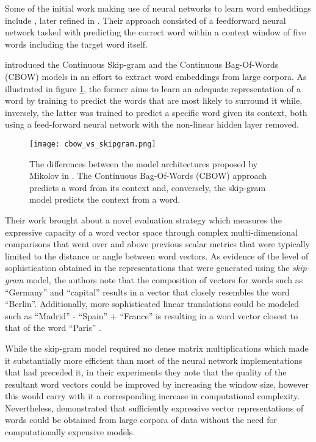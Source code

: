 \documentclass[../../fyp.tex]{subfiles}
\begin{document}
Some of the initial work making use of neural networks to learn word embeddings include \cite{collobert2008}, later refined in \cite{collobert2011}. Their approach consisted of a feedforward neural network tasked with predicting the correct word within a context window of five words including the target word itself.

\cite{mikolov2013} introduced the Continuous Skip-gram and the Continuous Bag-Of-Words (CBOW) models in an effort to extract word embeddings from large corpora. As illustrated in figure \ref{fig:cbow_vs_skipgram}, the former aims to learn an adequate representation of a word by training to predict the words that are most likely to surround it while, inversely, the latter was trained to predict a specific word given its context, both using a feed-forward neural network with the non-linear hidden layer removed.

\begin{figure}[!ht]
	\centering
	\texttt{[image: cbow\_vs\_skipgram.png]}
	\caption{The differences between the model architectures proposed by Mikolov in \cite{mikolov2013}. The Continuous Bag-Of-Words (CBOW) approach predicts a word from its context and, conversely, the skip-gram model predicts the context from a word. \cite{mikolov2013b}}
	\label{fig:cbow_vs_skipgram}
\end{figure}

Their work brought about a novel evaluation strategy which measures the expressive capacity of a word vector space through complex multi-dimensional comparisons that went over and above previous scalar metrics that were typically limited to the distance or angle between word vectors. As evidence of the level of sophistication obtained in the representations that were generated using the \textit{skip-gram} model, the authors note that the composition of vectors for words such as \enquote{Germany} and \enquote{capital} results in a vector that closely resembles the word \enquote{Berlin}. Additionally, more sophisticated linear translations could be modeled such as \enquote{Madrid} - \enquote{Spain} + \enquote{France} is resulting in a word vector closest to that of the word \enquote{Paris} \cite{mikolov2013c}.

While the skip-gram model required no dense matrix multiplications which made it substantially more efficient than most of the neural network implementations that had preceded it, in their experiments they note that the quality of the resultant word vectors could be improved by increasing the window size, however this would carry with it a corresponding increase in computational complexity. Nevertheless, \cite{mikolov2013} demonstrated that sufficiently expressive vector representations of words could be obtained from large corpora of data without the need for computationally expensive models.
\end{document}
